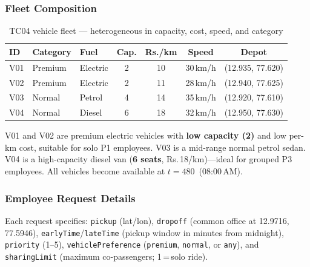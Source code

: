 \documentclass[11pt,a4paper]{article}
\newcommand{\rupee}{Rs.}
\newcommand{\code}[1]{\texttt{#1}}
\begin{document}
\subsubsection{Fleet Composition}

\begin{table}[H]
\centering
\caption{TC04 vehicle fleet --- heterogeneous in capacity, cost, speed, and category}
\label{tab:tc04-fleet}
\small
\begin{tabular}{lllcccc}
\toprule
\textbf{ID} & \textbf{Category} & \textbf{Fuel} & \textbf{Cap.} & \textbf{\rupee/km} & \textbf{Speed} & \textbf{Depot} \\
\midrule
\rowcolor{rowalt}
V01 & Premium & Electric & 2 & 10 & 30\,km/h & (12.935, 77.620) \\
V02 & Premium & Electric & 2 & 11 & 28\,km/h & (12.940, 77.625) \\
\rowcolor{rowalt}
V03 & Normal  & Petrol   & 4 & 14 & 35\,km/h & (12.920, 77.610) \\
V04 & Normal  & Diesel   & 6 & 18 & 32\,km/h & (12.950, 77.630) \\
\bottomrule
\end{tabular}
\end{table}

V01 and V02 are premium electric vehicles with \textbf{low capacity (2)} and low per-km cost, suitable for solo P1 employees. V03 is a mid-range normal petrol sedan. V04 is a high-capacity diesel van (\textbf{6 seats}, \rupee\,18/km)---ideal for grouped P3 employees. All vehicles become available at $t = 480$~(08:00\,AM).

\subsubsection{Employee Request Details}

Each request specifies: \code{pickup} (lat/lon), \code{dropoff} (common office at 12.9716,\,77.5946), \code{earlyTime}/\code{lateTime} (pickup window in minutes from midnight), \code{priority} (1--5), \code{vehiclePreference} (\texttt{premium}, \texttt{normal}, or \texttt{any}), and \code{sharingLimit} (maximum co-passengers; 1\,=\,solo ride).
\end{document}

